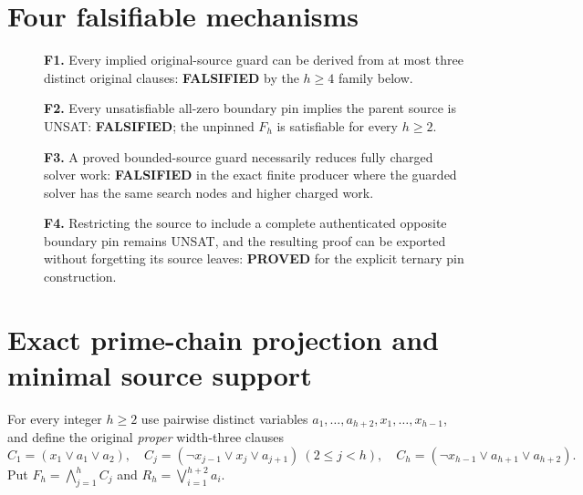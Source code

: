 \documentclass[11pt]{article}
\begin{document}
\section{Four falsifiable mechanisms}
\begin{description}
\item[] \textbf{F1.} Every implied original-source guard can be
derived from at most three distinct original clauses:
\textbf{FALSIFIED} by the $h\ge4$ family below.
\item[] \textbf{F2.} Every unsatisfiable all-zero boundary pin
implies the parent source is UNSAT: \textbf{FALSIFIED}; the unpinned
$F_h$ is satisfiable for every $h\ge2$.
\item[] \textbf{F3.} A proved bounded-source guard necessarily reduces
fully charged solver work: \textbf{FALSIFIED} in the exact finite
producer where the guarded solver has the same search nodes and
higher charged work.
\item[] \textbf{F4.} Restricting the source to include a complete
authenticated opposite boundary pin remains UNSAT, and the resulting
proof can be exported without forgetting its source leaves:
\textbf{PROVED} for the explicit ternary pin construction.
\end{description}

\section{Exact prime-chain projection and minimal source support}
For every integer $h\ge2$ use pairwise distinct variables
$a_1,\ldots,a_{h+2},x_1,\ldots,x_{h-1}$, and define the original
\emph{proper} width-three clauses
\[
 C_1=(x_1\vee a_1\vee a_2),\quad
 C_j=(\neg x_{j-1}\vee x_j\vee a_{j+1})\ (2\le j<h),\quad
 C_h=(\neg x_{h-1}\vee a_{h+1}\vee a_{h+2}).
\]
Put $F_h=\bigwedge_{j=1}^h C_j$ and
$R_h=\bigvee_{i=1}^{h+2}a_i$.
\end{document}
